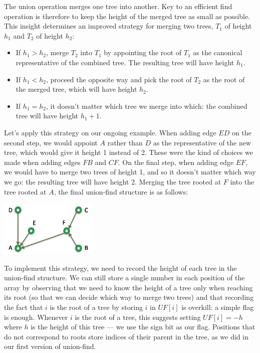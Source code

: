 The union operation merges one tree into another.  Key to an efficient
find operation is therefore to keep the height of the merged tree as
small as possible.  This insight determines an improved strategy for
merging two trees, $T_1$ of height $h_1$ and $T_2$ of height $h_2$:
\begin{itemize}
\item%
  If $h_1 > h_2$, merge $T_2$ into $T_1$ by appointing the root of
  $T_1$ as the canonical representative of the combined tree.  The
  resulting tree will have height $h_1$.
\item%
  If $h_1 < h_2$, proceed the opposite way and pick the root of $T_2$
  as the root of the merged tree, which will have height $h_2$.
\item%
  If $h_1 = h_2$, it doesn't matter which tree we merge into which:
  the combined tree will have height $h_1 + 1$.
\end{itemize}
Let's apply this strategy on our ongoing example.  When adding edge
$ED$ on the second step, we would appoint $A$ rather than $D$ as the
representative of the new tree, which would give it height 1 instead
of 2.  These were the kind of choices we made when adding edges $FB$
and $CF$.  On the final step, when adding edge $EF$, we would have to
merge two trees of height 1, and so it doesn't matter which way we go:
the resulting tree will have height 2.  Merging the tree rooted at $F$
into the tree rooted at $A$, the final union-find structure is as
follows:
\begin{center}
  \includegraphics[width=0.35\textwidth]{img/ufg5-ht.png}
\end{center}

To implement this strategy, we need to record the height of each tree
in the union-find structure.  We can still store a single number in
each position of the array by observing that we need to know the
height of a tree only when reaching its root (so that we can decide
which way to merge two trees) and that recording the fact that $i$ is
the root of a tree by storing $i$ in $\mathit{UF}[i]$ is overkill: a simple
flag is enough.  Whenever $i$ is the root of a tree, this suggests
setting $\mathit{UF}[i] = -h$ where $h$ is the height of this tree --- we use
the sign bit as our flag.  Positions that do not correspond to roots
store indices of their parent in the tree, as we did in our first
version of union-find.

